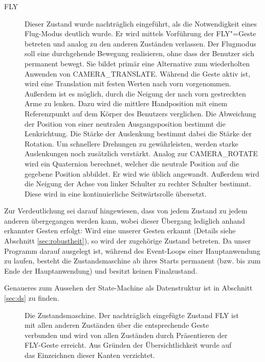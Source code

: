 \begin{description}
		\item[FLY] Dieser Zustand wurde nachträglich eingeführt, als die Notwendigkeit eines Flug-Modus deutlich wurde. Er wird mittels Vorführung der FLY"=Geste betreten und analog zu den anderen Zuständen verlassen. Der Flugmodus soll eine durchgehende Bewegung realisieren, ohne dass der Benutzer sich permanent bewegt. Sie bildet primär eine Alternative zum wiederholten Anwenden von CAMERA\_TRANSLATE. Während die Geste aktiv ist, wird eine Translation mit festen Werten nach vorn vorgenommen. Außerdem ist es möglich, durch die Neigung der nach vorn gestreckten Arme zu lenken. Dazu wird die mittlere Handposition mit einem Referenzpunkt auf dem Körper des Benutzers verglichen. Die Abweichung der Position von einer neutralen Ausgangsposition bestimmt die Lenkrichtung. Die Stärke der Auslenkung bestimmt dabei die Stärke der Rotation. Um schnellere Drehungen zu gewährleisten, werden starke Auslenkungen noch zusätzlich verstärkt. Analog zur CAMERA\_ROTATE wird ein Quaternion berechnet, welcher die neutrale Position auf die gegebene Position abbildet. Er wird wie üblich angewandt. Außerdem wird die Neigung der Achse von linker Schulter zu rechter Schulter bestimmt. Diese wird in eine kontinuierliche Seitwärtsrolle übersetzt.
	\end{description}
	Zur Verdeutlichung sei darauf hingewiesen, dass von jedem Zustand zu jedem anderen übergegangen werden kann, wobei dieser Übergang lediglich anhand erkannter Gesten erfolgt: Wird eine unserer Gesten erkannt (Details siehe Abschnitt \ref{sec:robustheit}), so wird der zugehörige Zustand betreten. Da unser Programm darauf ausgelegt ist, während des Event-Loops einer Hauptanwendung zu laufen, besteht die Zustandsmaschine ab ihres Starts permanent (bzw. bis zum Ende der Hauptanwendung) und besitzt keinen Finalzustand.\par
	Genaueres zum Aussehen der State-Machine als Datenstruktur ist in Abschnitt \ref{sec:ds} zu finden.
	\begin{figure}[h!]
	\centering
	
	\caption{Die Zustandsmaschine. Der nachträglich eingefügte Zustand FLY ist mit allen anderen Zuständen über die entsprechende Geste verbunden und wird von allen Zuständen durch Präsentieren der FLY-Geste erreicht. Aus Gründen der Übersichtlichkeit wurde auf das Einzeichnen dieser Kanten verzichtet.}\label{fig:sm}
	\end{figure}
